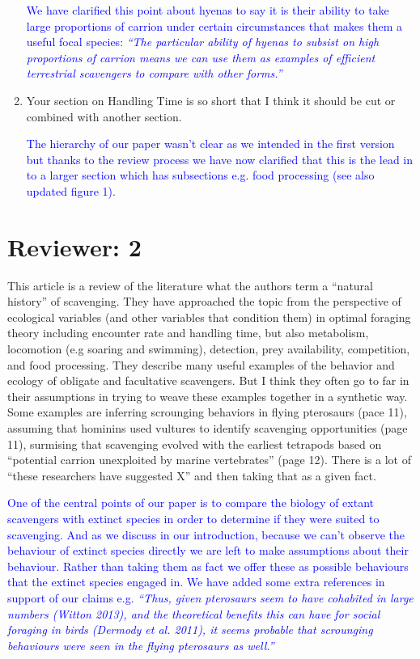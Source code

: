 \documentclass[12pt,letterpaper]{article}
\begin{document}
\begin{enumerate}
\textcolor{blue}{We have clarified this point about hyenas to say it is their ability to take large proportions of carrion under certain circumstances that makes them a useful focal species: \textit{``The particular ability of hyenas to subsist on high proportions of carrion means we can use them as examples of efficient terrestrial scavengers to compare with other forms.''}}

\item{Your section on Handling Time is so short that I think it should be cut or combined with another section.}

\textcolor{blue}{The hierarchy of our paper wasn't clear as we intended in the first version but thanks to the review process we have now clarified that this is the lead in to a larger section which has subsections e.g. food processing (see also updated figure 1).} 

\end{enumerate}

\section{Reviewer: 2}
This article is a review of the literature what the authors term a ``natural history'' of scavenging.
They have approached the topic from the perspective of ecological variables (and other variables that condition them) in optimal foraging theory including encounter rate and handling time, but also metabolism, locomotion (e.g soaring and swimming), detection, prey availability, competition, and food processing.
They describe many useful examples of the behavior and ecology of obligate and facultative scavengers.
But I think they often go to far in their assumptions in trying to weave these examples together in a synthetic way.
Some examples are inferring scrounging behaviors in flying pterosaurs (pace 11), assuming that hominins used vultures to identify scavenging opportunities (page 11), surmising that scavenging evolved with the earliest tetrapods based on ``potential carrion unexploited by marine vertebrates'' (page 12).
There is a lot of ``these researchers have suggested X'' and then taking that as a given fact.

\smallskip
\textcolor{blue}{One of the central points of our paper is to compare the biology of extant scavengers with extinct species in order to determine if they were suited to scavenging.
And as we discuss in our introduction, because we can't observe the behaviour of extinct species directly we are left to make assumptions about their behaviour. 
Rather than taking them as fact we offer these as possible behaviours that the extinct species engaged in.
We have added some extra references in support of our claims e.g. \textit {``Thus, given pterosaurs seem to have cohabited in large numbers (Witton 2013), and the theoretical benefits this can have for social foraging in birds (Dermody et al. 2011), it seems probable that scrounging behaviours were seen in the flying pterosaurs as well.''}}
\end{document}
